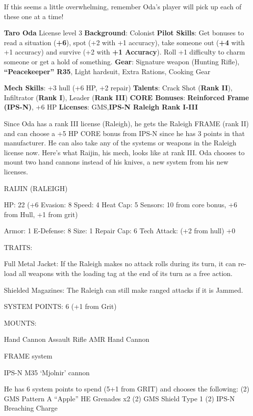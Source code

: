 If this seems a little overwhelming, remember Oda’s player will pick up each of these one at a time! 

\textbf{Taro Oda}
License level 3
\textbf{Background}: Colonist
\textbf{Pilot Skills}: Get bonuses to read a situation (\textbf{+6}), spot (+2 with +1 accuracy), take someone out
(\textbf{+4} with +1 accuracy) and survive (+2 with \textbf{+1 Accuracy}). Roll +1 difficulty to charm someone or get a hold of something.
\textbf{Gear}: Signature weapon (Hunting Rifle), \textbf{“Peacekeeper” R35}, Light hardsuit, Extra Rations, Cooking Gear

\textbf{Mech Skills}: +3 hull (+6 HP, +2 repair)
\textbf{Talents}: Crack Shot (\textbf{Rank II}), Infiltrator (\textbf{Rank I}), Leader (\textbf{Rank III})
\textbf{CORE Bonuses}: \textbf{Reinforced Frame (IPS-N)}, +6 HP
\textbf{Licenses}: GMS,\textbf{IPS-N Raleigh Rank I-III} 

Since Oda has a rank III license (Raleigh), he gets the Raleigh FRAME (rank II) and can choose a +5 HP CORE bonus from IPS-N since he has 3 points in that manufacturer. He can also take any of the systems or weapons in the Raleigh license now. Here’s what Raijin, his mech, looks like at rank III. Oda chooses to mount two hand cannons instead of his knives, a new system from his new licenses.

                                            RAIJIN (RALEIGH)

 HP: 22 (+6      Evasion: 8                            Speed: 4            Heat Cap: 5        Sensors: 10
 from core
 bonus, +6
 from Hull,
 +1 from grit)

 Armor: 1        E-Defense: 8                          Size: 1             Repair Cap: 6      Tech Attack:
                                                                           (+2 from hull)     +0

                                                    TRAITS:

 Full Metal Jacket: If the Raleigh makes no attack rolls during its turn, it can re-load all weapons with
 the loading tag at the end of its turn as a free action.

 Shielded Magazines: The Raleigh can still make ranged attacks if it is Jammed.

                                     SYSTEM POINTS: 6 (+1 from Grit)

                                                   MOUNTS:

 Hand Cannon
                       Assault Rifle                           AMR
 Hand Cannon

                                                FRAME system




                                          IPS-N M35 ‘Mjolnir’ cannon

He has 6 system points to spend (5+1 from GRIT) and chooses the following:
(2) GMS Pattern A “Apple” HE Grenades x2
(2) GMS Shield Type 1
(2) IPS-N Breaching Charge
